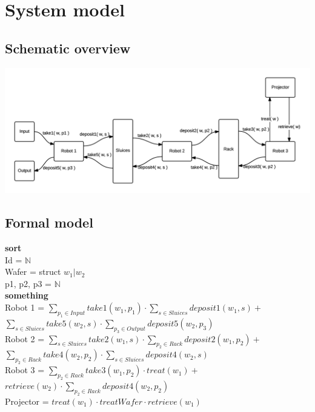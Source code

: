 \documentclass[12pt]{report}
\begin{document}
	\chapter{System model}
	\section{Schematic overview}
	\includegraphics[scale=0.9]{modelschema}
	
	\section{Formal model}
	\textbf{sort}\\
		Id = $\mathbb{N}$\\
		Wafer = struct $w_1 | w_2$\\
		p1, p2, p3 = $\mathbb{N}$\\
		
	\textbf{something}\\
		Robot 1 = $\sum\nolimits_{p_1 \in Input} take1( w_1, p_1 ) \cdot \sum\nolimits_{s \in Sluices} deposit1( w_1, s ) +$\smallskip\\ 
		\- \hspace{4.3em} $\sum\nolimits_{s \in Sluices} take5( w_2, s ) \cdot \sum\nolimits_{p_3 \in Output} deposit5( w_2, p_3 )$\bigskip\\
		Robot 2 = $\sum\nolimits_{s \in Sluices} take2( w_1, s ) \cdot \sum\nolimits_{p_2 \in Rack} deposit2( w_1, p_2 ) +$\smallskip\\ 
		\- \hspace{4.3em} $\sum\nolimits_{p_2 \in Rack} take4( w_2, p_2 ) \cdot \sum\nolimits_{s \in Sluices} deposit4( w_2, s )$ \bigskip\\
		Robot 3 = $\sum\nolimits_{p_2 \in Rack} take3( w_1, p_2 ) \cdot treat( w_1 ) +$\smallskip\\ 
		\- \hspace{4.3em} $retrieve( w_2 ) \cdot \sum\nolimits_{p_2 \in Rack} deposit4( w_2, p_2 )$\bigskip\\
		Projector = $treat( w_1 ) \cdot treatWafer \cdot retrieve( w_1 )$
\end{document}
